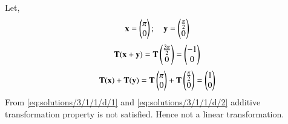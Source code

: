 Let,
\begin{align}
\mathbf{x}=
\begin{pmatrix}\pi \\0\end{pmatrix}; \quad
\mathbf{y}=
\begin{pmatrix}\frac{\pi}{2} \\0\end{pmatrix}\nonumber
\end{align}
\begin{align}\label{eq:solutions/3/1/1/d/1}
 \mathbf{T}(\mathbf{x+y})=\mathbf{T}\begin{pmatrix}\frac{3\pi}{2}\\0\end{pmatrix}=\begin{pmatrix}-1\\0\end{pmatrix}
\end{align}
\begin{align}
\mathbf{T}(\mathbf{x})+\mathbf{T}(\mathbf{y})=\mathbf{T}\begin{pmatrix}\pi\\0\end{pmatrix}+\mathbf{T}\begin{pmatrix}\frac{\pi}{2}\\0\end{pmatrix} = \begin{pmatrix}1\\0\end{pmatrix} \label{eq:solutions/3/1/1/d/2}
\end{align}
From \eqref{eq:solutions/3/1/1/d/1} and \eqref{eq:solutions/3/1/1/d/2} additive transformation property is not satisfied. Hence not a linear transformation.
   

